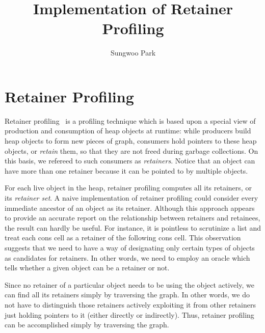 \documentclass{article}
\begin{document}
\title{Implementation of Retainer Profiling}
\author{Sungwoo Park}

\makeatactive
\maketitle

\section{Retainer Profiling}

Retainer profiling~\cite{CN} is a profiling technique which is based upon a 
special view of production and consumption of heap objects at runtime:
while producers build heap objects to form new pieces of graph,
consumers hold pointers to these heap objects, or \emph{retain} them, so 
that they are not freed during garbage collections. 
On this basis, we refereed to such consumers as \emph{retainers}.
Notice that an object can have more than one retainer because it can
be pointed to by multiple objects.

For each live object in the heap, retainer profiling computes 
all its retainers, or its \emph{retainer set}.
A naive implementation of retainer profiling could consider every
immediate ancestor of an object as its retainer.
Although this approach appears to provide an accurate report on the 
relationship between retainers and retainees, the result can hardly be useful.
For instance, it is pointless to scrutinize a list and treat each cons
cell as a retainer of the following cons cell.
This observation suggests that we need to have a way of designating only 
certain types of objects as candidates for retainers.
In other words, we need to employ an oracle which tells whether a given
object can be a retainer or not.

Since no retainer of a particular object needs to be using the
object actively, we can find all its retainers simply by traversing
the graph. In other words, we do not have to distinguish those retainers
actively exploiting it from other retainers just holding pointers
to it (either directly or indirectly).
Thus, retainer profiling can be accomplished simply by traversing the
graph.
\end{document}
